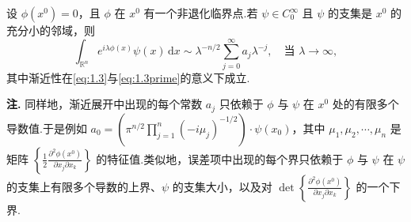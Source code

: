 \documentclass[
  BookTitleCN={傅里叶分析中的振动积分},
  BookTitleEN={Oscillatory Integrals in Fourier Analysis},
  OriginalAuthor={E.~M. Stein},
  OriginalEdition={Proc. Sympos. Pure Math. 35, Part~1},
  OriginalPublisher={American Mathematical Society},
  OriginalYear={1979},
  Translator={翻译及重排},
  ModelUsed={Codex CLI},
  Biblatex=false,
  TranslationDate={2026年8月27日}
]{mathtranslation}
\numberwithin{equation}{chapter}   %
\newcommand{\R}{\mathbb{R}}
\begin{document}
\begin{proposition}\label{prop:6}
  设 $\phi(x^{0})=0$，且 $\phi$ 在 $x^{0}$ 有一个非退化临界点.若 $\psi\in C_0^\infty$ 且 $\psi$ 的支集是 $x^{0}$ 的充分小的邻域，则
  \begin{equation}
    \int_{\R^n}e^{i\lambda\phi(x)}\psi(x)\,\mathrm{d}x \sim \lambda^{-n/2}\sum_{j=0}^{\infty}a_{j}\lambda^{-j},\quad\text{当 }\lambda\to\infty, \label{eq:2.2}
  \end{equation}
  其中渐近性在\eqref{eq:1.3}与\eqref{eq:1.3prime}的意义下成立.
\end{proposition}

\noindent\textbf{注.} 同样地，渐近展开中出现的每个常数 $a_{j}$ 只依赖于 $\phi$ 与 $\psi$ 在 $x^{0}$ 处的有限多个导数值.于是例如 $a_{0}=\left(\pi^{n/2}\prod_{j=1}^{n}(-i\mu_j)^{-1/2}\right)\cdot\psi(x_0)$，其中 $\mu_1,\mu_2,\cdots,\mu_n$ 是矩阵 $\left\{\frac{1}{2}\frac{\partial^{2}\phi(x^{0})}{\partial x_j\partial x_k}\right\}$ 的特征值.类似地，误差项中出现的每个界只依赖于 $\phi$ 与 $\psi$ 在 $\psi$ 的支集上有限多个导数的上界、$\psi$ 的支集大小，以及对 $\det\left\{\frac{\partial^{2}\phi(x^{0})}{\partial x_j\partial x_k}\right\}$ 的一个下界.
\end{document}
